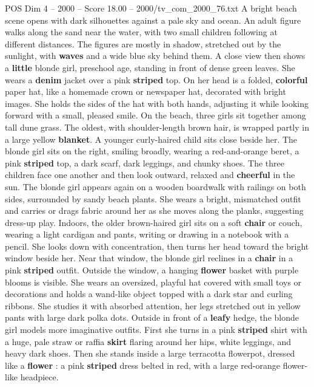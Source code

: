 \begin{textsample}{POS Dim 4 – 2000 – Score 18.00 – 2000/tv\_com\_2000\_76.txt}  \label{ex:f4_pos_052}
A bright beach scene opens with dark silhouettes against a pale sky and ocean.
An adult figure walks along the sand near the water, with two small children following at different distances.
The figures are mostly in shadow, stretched out by the sunlight, with \textbf{waves} and a wide blue sky behind them.
A close view then shows a \textbf{little} blonde girl, preschool age, standing in front of dense green leaves.
She wears a \textbf{denim} jacket over a pink \textbf{striped} top.
On her head is a folded, \textbf{colorful} paper hat, like a homemade crown or newspaper hat, decorated with bright images.
She holds the sides of the hat with both hands, adjusting it while looking forward with a small, pleased smile.
On the beach, three girls sit together among tall dune grass.
The oldest, with shoulder-length brown hair, is wrapped partly in a large yellow \textbf{blanket}.
A younger curly-haired child sits close beside her.
The blonde girl sits on the right, smiling broadly, wearing a red-and-orange beret, a pink \textbf{striped} top, a dark scarf, dark leggings, and chunky shoes.
The three children face one another and then look outward, relaxed and \textbf{cheerful} in the sun.
The blonde girl appears again on a wooden boardwalk with railings on both sides, surrounded by sandy beach plants.
She wears a bright, mismatched outfit and carries or drags fabric around her as she moves along the planks, suggesting dress-up play.
Indoors, the older brown-haired girl sits on a soft \textbf{chair} or couch, wearing a light cardigan and pants, writing or drawing in a notebook with a pencil.
She looks down with concentration, then turns her head toward the bright window beside her.
Near that window, the blonde girl reclines in a \textbf{chair} in a pink \textbf{striped} outfit.
Outside the window, a hanging \textbf{flower} basket with purple blooms is visible.
She wears an oversized, playful hat covered with small toys or decorations and holds a wand-like object topped with a dark star and curling ribbons.
She studies it with absorbed attention, her legs stretched out in yellow pants with large dark polka dots.
Outside in front of a \textbf{leafy} hedge, the blonde girl models more imaginative outfits.
First she turns in a pink \textbf{striped} shirt with a huge, pale straw or raffia \textbf{skirt} flaring around her hips, white leggings, and heavy dark shoes.
Then she stands inside a large terracotta flowerpot, dressed like a \textbf{flower} : a pink \textbf{striped} dress belted in red, with a large red-orange flower-like headpiece.

\end{textsample}
